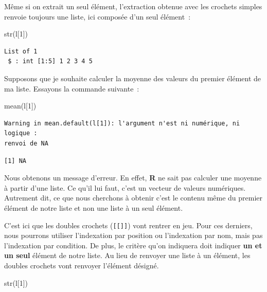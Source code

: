 \documentclass[
  letterpaper,
  DIV=11,
  numbers=noendperiod,
  oneside]{scrreprt}
\newenvironment{Shaded}{\begin{snugshade}}{\end{snugshade}}
\newcommand{\DecValTok}[1]{\textcolor[rgb]{0.68,0.00,0.00}{#1}}
\newcommand{\FunctionTok}[1]{\textcolor[rgb]{0.28,0.35,0.67}{#1}}
\newcommand{\NormalTok}[1]{\textcolor[rgb]{0.00,0.23,0.31}{#1}}
\begin{document}
Même si on extrait un seul élément, l'extraction obtenue avec les
crochets simples renvoie toujours une liste, ici composée d'un seul
élément~:

\begin{Shaded}
\begin{Highlighting}[]
\FunctionTok{str}\NormalTok{(l[}\DecValTok{1}\NormalTok{])}
\end{Highlighting}
\end{Shaded}

\begin{verbatim}
List of 1
 $ : int [1:5] 1 2 3 4 5
\end{verbatim}

Supposons que je souhaite calculer la moyenne des valeurs du premier
élément de ma liste. Essayons la commande suivante~:

\begin{Shaded}
\begin{Highlighting}[]
\FunctionTok{mean}\NormalTok{(l[}\DecValTok{1}\NormalTok{])}
\end{Highlighting}
\end{Shaded}

\begin{verbatim}
Warning in mean.default(l[1]): l'argument n'est ni numérique, ni logique :
renvoi de NA
\end{verbatim}

\begin{verbatim}
[1] NA
\end{verbatim}

Nous obtenons un message d'erreur. En effet, \textbf{R} ne sait pas
calculer une moyenne à partir d'une liste. Ce qu'il lui faut, c'est un
vecteur de valeurs numériques. Autrement dit, ce que nous cherchons à
obtenir c'est le contenu même du premier élément de notre liste et non
une liste à un seul élément.

C'est ici que les doubles crochets (\texttt{{[}{[}{]}{]}}) vont rentrer
en jeu. Pour ces derniers, nous pourrons utiliser l'indexation par
position ou l'indexation par nom, mais pas l'indexation par condition.
De plus, le critère qu'on indiquera doit indiquer \textbf{un et un seul}
élément de notre liste. Au lieu de renvoyer une liste à un élément, les
doubles crochets vont renvoyer l'élément désigné.

\begin{Shaded}
\begin{Highlighting}[]
\FunctionTok{str}\NormalTok{(l[}\DecValTok{1}\NormalTok{])}
\end{Highlighting}
\end{Shaded}
\end{document}
